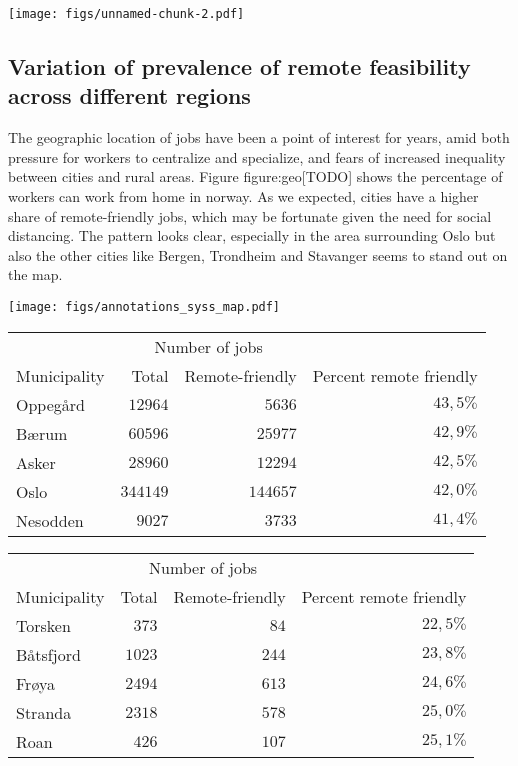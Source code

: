 \documentclass[11pt,]{article}
\begin{document}
\texttt{[image: figs/unnamed-chunk-2.pdf]}

\hypertarget{variation-of-prevalence-of-remote-feasibility-across-different-regions}{%
\subsection{Variation of prevalence of remote feasibility across
different
regions}\label{variation-of-prevalence-of-remote-feasibility-across-different-regions}}

The geographic location of jobs have been a point of interest for years,
amid both pressure for workers to centralize and specialize, and fears
of increased inequality between cities and rural areas. Figure
figure:geo{[}TODO{]} shows the percentage of workers can work from home
in norway. As we expected, cities have a higher share of remote-friendly
jobs, which may be fortunate given the need for social distancing. The
pattern looks clear, especially in the area surrounding Oslo but also
the other cities like Bergen, Trondheim and Stavanger seems to stand out
on the map.

\texttt{[image: figs/annotations\_syss\_map.pdf]}

\captionsetup[table]{labelformat=empty,skip=1pt}
\begin{longtable}{lrrr}
\toprule
& \multicolumn{2}{c}{Number of jobs} & \\ 
 \cmidrule(lr){2-3}
Municipality & Total & Remote-friendly & Percent remote friendly \\ 
\midrule
Oppegård & $12 964$ & $5 636$ & $43,5\%$ \\ 
Bærum & $60 596$ & $25 977$ & $42,9\%$ \\ 
Asker & $28 960$ & $12 294$ & $42,5\%$ \\ 
Oslo & $344 149$ & $144 657$ & $42,0\%$ \\ 
Nesodden & $9 027$ & $3 733$ & $41,4\%$ \\ 
\bottomrule
\end{longtable}
\captionsetup[table]{labelformat=empty,skip=1pt}
\begin{longtable}{lrrr}
\toprule
& \multicolumn{2}{c}{Number of jobs} & \\ 
 \cmidrule(lr){2-3}
Municipality & Total & Remote-friendly & Percent remote friendly \\ 
\midrule
Torsken & $373$ & $84$ & $22,5\%$ \\ 
Båtsfjord & $1 023$ & $244$ & $23,8\%$ \\ 
Frøya & $2 494$ & $613$ & $24,6\%$ \\ 
Stranda & $2 318$ & $578$ & $25,0\%$ \\ 
Roan & $426$ & $107$ & $25,1\%$ \\ 
\bottomrule
\end{longtable}
\end{document}
